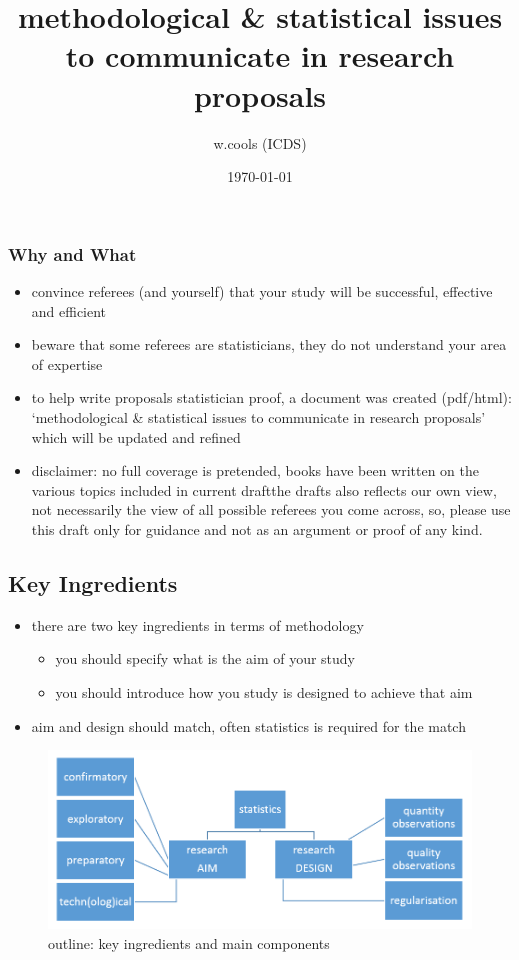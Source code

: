 \documentclass[]{article}
\title{methodological \& statistical issues\\
to communicate in research proposals}
\author{w.cools (ICDS)}
\date{\today}
\providecommand{\tightlist}{%
  \setlength{\itemsep}{0pt}\setlength{\parskip}{0pt}}
\begin{document}
\maketitle

\subsubsection{Why and What}\label{why-and-what}

\begin{itemize}
\tightlist
\item
  convince referees (and yourself) that your study will be successful,
  effective and efficient
\item
  beware that some referees are statisticians, they do not understand
  your area of expertise
\item
  to help write proposals statistician proof, a document was created
  (pdf/html): `methodological \& statistical issues to communicate in
  research proposals' which will be updated and refined
\item
  disclaimer: no full coverage is pretended, books have been written on
  the various topics included in current draftthe drafts also reflects
  our own view, not necessarily the view of all possible referees you
  come across, so, please use this draft only for guidance and not as an
  argument or proof of any kind.
\end{itemize}

\subsection{Key Ingredients}\label{key-ingredients}

\begin{itemize}
\tightlist
\item
  there are two key ingredients in terms of methodology

  \begin{itemize}
  \tightlist
  \item
    you should specify what is the aim of your study
  \item
    you should introduce how you study is designed to achieve that aim
  \end{itemize}
\item
  aim and design should match, often statistics is required for the
  match
\end{itemize}

\begin{figure}[htbp]
\centering
\includegraphics{graph.png}
\caption{outline: key ingredients and main components}
\end{figure}
\end{document}
